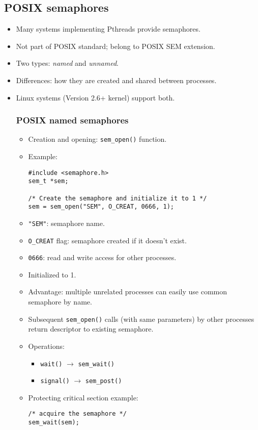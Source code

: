 \subsection{POSIX semaphores}
\begin{itemize}
    \item Many systems implementing Pthreads provide semaphores.
    \item Not part of POSIX standard; belong to POSIX SEM extension.
    \item Two types: \textit{named} and \textit{unnamed}.
    \item Differences: how they are created and shared between processes.
    \item Linux systems (Version 2.6+ kernel) support both.

    \subsubsection{POSIX named semaphores}
    \begin{itemize}
        \item Creation and opening: \texttt{sem\_open()} function.
        \item Example:
        \begin{verbatim}
#include <semaphore.h>
sem_t *sem;
 
/* Create the semaphore and initialize it to 1 */
sem = sem_open("SEM", O_CREAT, 0666, 1);
        \end{verbatim}
        \item \texttt{"SEM"}: semaphore name.
        \item \texttt{O\_CREAT} flag: semaphore created if it doesn't exist.
        \item \texttt{0666}: read and write access for other processes.
        \item Initialized to 1.
        \item Advantage: multiple unrelated processes can easily use common semaphore by name.
        \item Subsequent \texttt{sem\_open()} calls (with same parameters) by other processes return descriptor to existing semaphore.
        \item Operations:
        \begin{itemize}
            \item \texttt{wait()} $\rightarrow$ \texttt{sem\_wait()}
            \item \texttt{signal()} $\rightarrow$ \texttt{sem\_post()}
        \end{itemize}
        \item Protecting critical section example:
        \begin{verbatim}
/* acquire the semaphore */
sem_wait(sem);
 

\end{verbatim}
\end{itemize}
\end{itemize}
